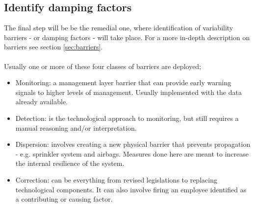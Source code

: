 \documentclass[10pt,oneside]{book}                  %
\begin{document}
\subsection{Identify damping factors}

The final step will be be the remedial one, where identification of variability barriers - or damping factors - will take place. For a more in-depth description on barriers see section \ref{sec:barriers}.\\
\\
Usually one or more of these four classes of barriers are deployed;
\begin{itemize}
  \item Monitoring: a management layer barrier that can provide early warning signals to higher levels of management. Usually implemented with the data already available.
  \item Detection: is the technological approach to monitoring, but still requires a manual reasoning and/or interpretation.
  \item Dispersion: involves creating a new physical barrier that prevents propagation - e.g. sprinkler system and airbags. Measures done here are meant to increase the internal resilience of the system.
  \item Correction: can be everything from revised legislations to replacing technological components. It can also involve firing an employee identified as a contributing or causing factor.
\end{itemize}
\end{document}
